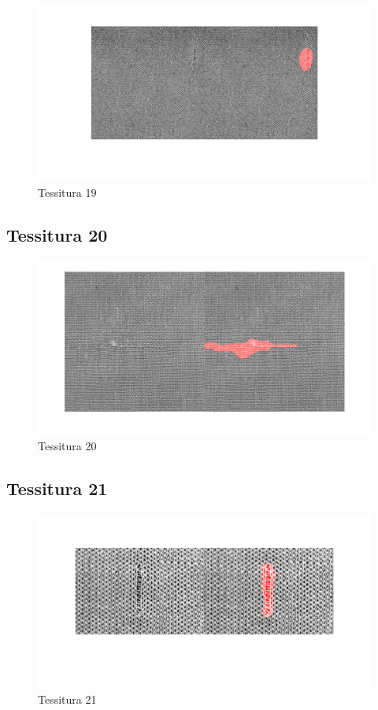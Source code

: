 \documentclass{article}
\begin{document}
\begin{figure}[h!]
	\centering
	\includegraphics[width=\textwidth]{results/res19.jpg}
	\caption{Tessitura 19}
\end{figure}

\subsection{Tessitura 20}

\begin{figure}[h!]
	\centering
	\includegraphics[width=\textwidth]{results/res20.jpg}
	\caption{Tessitura 20}
\end{figure}

\newpage

\subsection{Tessitura 21}

\begin{figure}[h!]
	\centering
	\includegraphics[width=\textwidth]{results/res21.jpg}
	\caption{Tessitura 21}
\end{figure}
\end{document}
